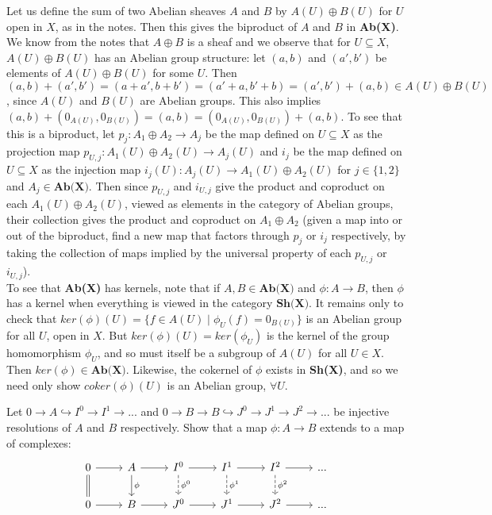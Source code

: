 Let us define the sum of two Abelian sheaves $A$ and $B$ by $A(U) \oplus B(U)$ for $U$ open in $X$, as in the notes. Then this gives the biproduct of $A$ and $B$ in \textbf{Ab(X)}. We know from the notes that $A \oplus B$ is a sheaf and we observe that for $U \subseteq X$, $A(U) \oplus B(U)$ has an Abelian group structure: let $(a,b)$ and $(a',b')$ be elements of $A(U) \oplus B(U)$ for some $U$. Then $(a,b) + (a',b') = (a +a', b+b') = (a'+a,b'+b) = (a',b') + (a,b) \in A(U) \oplus B(U)$, since $A(U)$ and $B(U)$ are Abelian groups. This also implies $(a,b) +(0_{A(U)}, 0_{B(U)}) = (a,b) = (0_{A(U)}, 0_{B(U)}) + (a,b)$. To see that this is a biproduct, let $p_j: A_1 \oplus A_2 \rightarrow A_j$ be the map defined on $U \subseteq X$ as the projection map $p_{U,j}: A_1(U) \oplus A_2(U) \rightarrow A_j(U)$ and $i_j$ be the map defined on $U \subseteq X$ as the injection map $i_j(U): A_j(U) \rightarrow A_1(U) \oplus A_2(U) $ for $j \in \{1,2\}$ and $A_j \in \textbf{Ab(X)}$. Then since $p_{U,j}$ and $i_{U,j}$ give the product and coproduct on each $A_1(U) \oplus A_2(U)$, viewed as elements in the category of Abelian groups, their collection gives the product and coproduct on $A_1 \oplus A_2$ (given a map into or out of the biproduct, find a new map that factors through $p_j$ or $i_j$ respectively, by taking the collection of maps implied by the universal property of each $p_{U,j}$ or $i_{U,j}$).\\

To see that \textbf{Ab(X)} has kernels, note that if $A,B \in \textbf{Ab(X)}$ and $\phi: A \rightarrow B$, then $\phi$ has a kernel when everything is viewed in the category $\textbf{Sh(X)}$. It remains only to check that $ker(\phi)(U) = \{f \in A(U) \mid \phi_U(f) = 0_{B(U)}\}$ is an Abelian group for all $U$, open in $X$. But $ker(\phi)(U) = ker(\phi_U)$ is the kernel of the group homomorphism $\phi_U$, and so must itself be a subgroup of $A(U)$ for all $U \in X$. Then $ker(\phi) \in \textbf{Ab(X)}$. Likewise, the cokernel of $\phi$ exists in \textbf{Sh(X)}, and so we need only show $coker(\phi)(U)$ is an Abelian group, $\forall U$.

 Let $0 \rightarrow A \hookrightarrow I^0 \rightarrow I^1 \rightarrow ...$ and $0 \rightarrow B \rightarrow B \hookrightarrow J^0 \rightarrow J^1 \rightarrow J^2 \rightarrow ...$ be injective resolutions of $A$ and $B$ respectively. Show that a map $\phi: A \rightarrow B$ extends to a map of complexes:
\[
\begin{tikzcd}
0 \arrow[r] \arrow[d, equal]
& A \arrow[r] \arrow[d, "\phi"]
& I^0 \arrow[r] \arrow[d, "\phi^0", dashed]
& I^1 \arrow[r] \arrow[d, "\phi^1", dashed]
& I^2 \arrow[r] \arrow[d, "\phi^2", dashed]
& ...
\\
0 \arrow[r]
& B \arrow[r]
& J^0 \arrow[r]
& J^1 \arrow[r]
& J^2 \arrow[r]
& ...
\end{tikzcd}
\]

